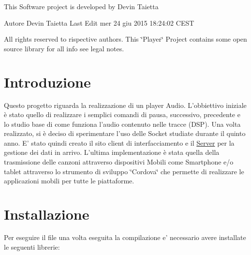 \-This \-Software project is developed by \-Devin \-Taietta \par
 \begin{DoxyAuthor}{\-Autore}
\-Devin \-Taietta \-Last \-Edit mer 24 giu 2015 18\-:24\-:02 \-C\-E\-S\-T \par
 \-All rights reserved to rispective authors. \-This \char`\"{}\-Player\char`\"{} \-Project contains some open source library for all info see legal notes.
\end{DoxyAuthor}
\hypertarget{index_intro_sec}{}\section{\-Introduzione}\label{index_intro_sec}
\-Questo progetto riguarda la realizzazione di un player \-Audio. \-L'obbiettivo iniziale è stato quello di realizzare i semplici comandi di pausa, successivo, precedente e lo studio base di come funziona l'audio contenuto nelle tracce (\-D\-S\-P). \-Una volta realizzato, si è deciso di sperimentare l'uso delle \-Socket studiate durante il quinto anno. \-E' stato quindi creato il sito client di interfacciamento e il \hyperlink{classServer}{\-Server} per la gestione dei dati in arrivo. \-L'ultima implementazione è stata quella della trasmissione delle canzoni attraverso dispositivi \-Mobili come \-Smartphone e/o tablet attraverso lo strumento di sviluppo \char`\"{}\-Cordova\char`\"{} che permette di realizzare le applicazioni mobili per tutte le piattaforme. \par
 \hypertarget{index_install_sec}{}\section{\-Installazione}\label{index_install_sec}
\-Per eseguire il file una volta eseguita la compilazione e' necessario avere installate le seguenti librerie\-:
